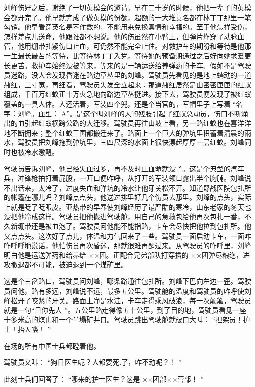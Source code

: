 \documentclass[12pt,twoside,openany]{book}
\begin{document}
刘峰伤好之后，谢绝了一切英模会的邀请。早在二十岁的时候，他把一辈子的英模会都开完了。他早就完成了做英模的份额，超额的一大堆英名都在林丁丁那里一笔勾销。他早看穿英名是不作数的，不能用来兑换真情和幸福的。至于他怎样受伤，怎样差点儿送命，他跟谁都不想说。他的伤虽然在小臂上，但弹片炸穿了动脉血管，他用绷带扎紧伤口止血，可仍然不能完全止住。对救护车的期盼和等待是他那一生最长最苦的等待，比等待林丁丁入党，等待她的预备期通过之后好向她求爱更长更苦。救护车始终没被等来，等来的是一辆运送给养弹药的卡车。假如不是驾驶员迷路，没人会发现昏迷在路边草丛里的刘峰。驾驶员先看见的是地上蠕动的一道赭红，三寸宽，再细看，驾驶员头发全立起来：那道赭红居然是由密密匝匝的红蚁组成，千百万红蚁正十万火急地向路边草丛挺进。接下去，驾驶员便发现了被红蚁覆盖的一具人体。人还活着，军装四个兜，还是个当官的，军帽里子上写着 “名字：刘峰。血型： A”。是这个叫刘峰的人的残肢引起了红蚁总动员，伤口不断涌出的血引起红蚁横跨公路的大迁移。驾驶员再往山坡上看，另一路红蚁也在喜洋洋地不断拥来；整个红蚁王国都搬迁来了。路面上一个巨大的弹坑里积蓄着清晨的雨水，驾驶员把刘峰拖到弹坑里，三四尺深的水面上很快漂起厚厚一层红蚁。刘峰同时也被冷水激醒。

驾驶员告诉刘峰，他已经失血过多，再不及时止血命就没了。这是个典型的汽车兵，冲锋枪拍打着屁股，一开口便咋呼，从打开的军装领口露出半个胸脯。刘峰说不出话来，太冷了，过度失血和弹坑的冷水让他牙关松不开。知道野战医院包扎所的帐篷在哪儿吗？刘峰点点头，他送过排里好几个伤员去那里。刘峰的点头，实际上就是眨了眨眼皮。亚热带的早春使刘峰经历了最严酷的寒冷，山东老家的冬天也没把他冷成这样。驾驶员把他搬进驾驶舱，用自己的急救包给他再次包扎一番，不久新绷带还是被血泡了。驾驶员问他能不能指路，卡车会尽快把他拉到包扎所。他又点点头。这次好了点儿，体温和力气回来了一些。驾驶员一面启动卡车，一面咋咋呼呼地说话，他怕伤员再次昏迷，那就很难再醒过来。从驾驶员的咋呼里，刘峰明白他是运送弹药和给养给 ××团。正配合兄弟部队打穿插的 ××团弹尽粮绝，进攻撤退都不可能，被迫退到一个煤矿里。

这是个三岔路口，驾驶员问刘峰，哪条路通往包扎所。刘峰下巴向左边一歪。驾驶员问他，路有多远，刘峰说不远，最多五公里。驾驶舱的温度和驾驶员的咋呼使刘峰松开了咬紧的牙关。路面上净是水洼，卡车走得乘风破浪，每一次颠簸，驾驶员就是一句“日你先人 ”。五公里路走得像五十公里，到了目的地，驾驶员看见一座十多米高的煤山和一个半塌矿井口。驾驶员跳出驾驶舱就破口大叫： “担架员！护士！抬人喽！ ”

在场的所有中国士兵都瞪着他。

驾驶员又叫： “狗日医生呢？人都要死.了，咋不动呢？！ ”

此刻士兵们回答了： “哪来的护士医生？这是 ××团部××营部！ ”
\end{document}
